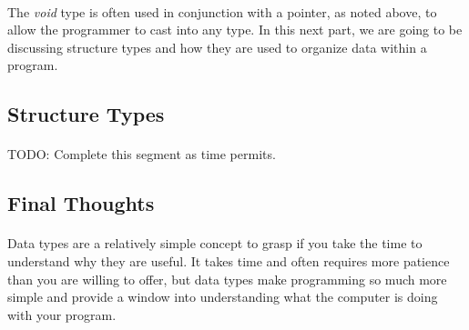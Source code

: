    \paragraph{}
      The \textit{void} type is often used in conjunction with a pointer, as noted above, to allow the programmer to cast into any type.
      In this next part, we are going to be discussing structure types and how they are used to organize data within a program.

\newpage

\subsection{Structure Types}
   \paragraph{}
      TODO: Complete this segment as time permits.

\newpage

\subsection{Final Thoughts}
   \paragraph{}
      Data types are a relatively simple concept to grasp if you take the time to understand why they are useful.
      It takes time and often requires more patience than you are willing to offer, but data types make programming so much more simple
      and provide a window into understanding what the computer is doing with your program.

\newpage
